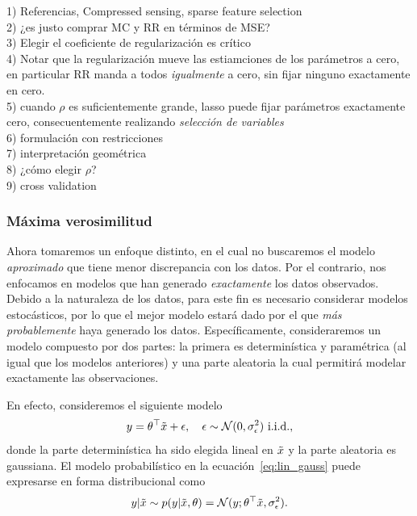 \begin{mdframed}[style=pendiente, frametitle={\center Regularización versus mínimos cuadrados}]
1) Referencias, Compressed sensing, sparse feature selection\\
2) ¿es justo comprar MC y RR en términos de MSE?\\
3) Elegir el coeficiente de regularización es crítico\\
4) Notar que la regularización mueve las estiamciones de los parámetros a cero, en particular RR manda a todos \emph{igualmente} a cero, sin fijar ninguno exactamente en cero. \\
5) cuando $\rho$ es suficientemente grande, lasso puede fijar parámetros exactamente cero, consecuentemente realizando \emph{selección de variables}\\
6) formulación con restricciones\\
7) interpretación geométrica\\
8) ¿cómo elegir $\rho$?\\
9) cross validation
	
\end{mdframed}

\subsubsection{Máxima verosimilitud} %
\label{ssub:max_ver}

Ahora tomaremos un enfoque distinto, en el cual no buscaremos el modelo \emph{aproximado} que tiene menor discrepancia con los datos. Por el contrario, nos enfocamos en modelos que han generado \emph{exactamente} los datos observados. Debido a la naturaleza de los datos, para este fin es necesario considerar modelos estocásticos, por lo que el mejor modelo estará dado por el que \emph{más probablemente} haya generado los datos. Específicamente, consideraremos un modelo compuesto por dos partes: la primera es determinística y paramétrica (al igual que los modelos anteriores) y una parte aleatoria la cual permitirá modelar exactamente las observaciones. 

En efecto, consideremos el siguiente modelo
\begin{equation}
	y = \theta^\top\tilde{x} + \epsilon,\quad \epsilon\sim{\mathcal N}(0,\sigma_\epsilon^2) \ \text{i.i.d.},
	\label{eq:lin_gauss}
\end{equation}
donde la parte determinística ha sido elegida lineal en $\tilde{x}$ y la parte aleatoria es gaussiana. El modelo probabilístico en la ecuación~\eqref{eq:lin_gauss} puede expresarse en forma distribucional como 
\begin{equation}
	y|\tilde{x} \sim p(y|\tilde{x},\theta) = {\mathcal N}(y;\theta^\top\tilde{x},\sigma_\epsilon^2).
\end{equation}

